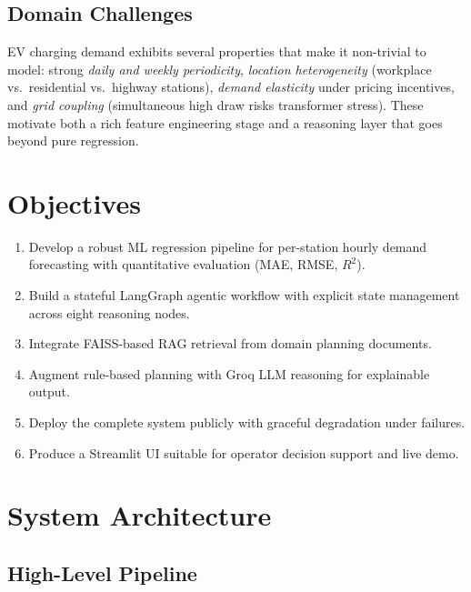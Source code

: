 \documentclass[12pt,a4paper]{article}
\begin{document}
\subsection{Domain Challenges}

EV charging demand exhibits several properties that make it non-trivial to model:
strong \textit{daily and weekly periodicity}, \textit{location heterogeneity} (workplace
vs.\ residential vs.\ highway stations), \textit{demand elasticity} under pricing
incentives, and \textit{grid coupling} (simultaneous high draw risks transformer stress).
These motivate both a rich feature engineering stage and a reasoning layer that goes
beyond pure regression.

\section{Objectives}
\label{sec:objectives}

\begin{enumerate}[leftmargin=*, label=\textbf{O\arabic*.}]
  \item Develop a robust ML regression pipeline for per-station hourly demand
    forecasting with quantitative evaluation (MAE, RMSE, $R^2$).
  \item Build a stateful LangGraph agentic workflow with explicit state management
    across eight reasoning nodes.
  \item Integrate FAISS-based RAG retrieval from domain planning documents.
  \item Augment rule-based planning with Groq LLM reasoning for explainable output.
  \item Deploy the complete system publicly with graceful degradation under failures.
  \item Produce a Streamlit UI suitable for operator decision support and live demo.
\end{enumerate}

\section{System Architecture}
\label{sec:architecture}

\subsection{High-Level Pipeline}
\end{document}
